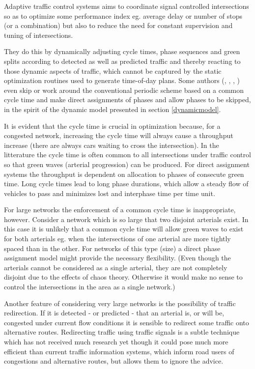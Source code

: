 \label{adaptive_cooperation}
Adaptive traffic control systems aims to coordinate signal controlled intersections so as to optimize some performance index eg. average delay or number of stops (or a combination) but also to reduce the need for constant supervision and tuning of intersections.

They do this by dynamically adjusting cycle times, phase sequences and green splits according to detected as well as predicted traffic and thereby reacting to those dynamic aspects of traffic, which cannot be captured by the static optimization routines used to generate time-of-day plans. Some authors (\cite{1}, \cite{44}, \cite{46}, \cite{scoot2004}) even skip or work around the conventional periodic scheme based on a common cycle time and make direct assignments of phases and allow phases to be skipped, in the spirit of the dynamic model presented in section \ref{dynamicmodel}. 

It is evident that the cycle time is crucial in optimization because, for a congested network, increasing the cycle time will always cause a throughput increase (there are always cars waiting to cross the intersection). In the litterature the cycle time is often common to all intersections under traffic control so that green waves (arterial progression) can be produced. For direct assignment systems the throughput is dependent on allocation to phases of consecute green time. Long cycle times lead to long phase durations, which allow a steady flow of vehicles to pass and minimizes lost and interphase time per time unit.

For large networks the enforcement of a common cycle time is inappropriate, however. Consider a network which is so large that two disjoint arterials exist. In this case it is unlikely that a common cycle time will allow green waves to exist for both arterials eg. when the intersections of one arterial are more tightly spaced than in the other. For networks of this type (size) a direct phase assignment model might provide the necessary flexibility. (Even though the arterials cannot be considered as a single arterial, they are not completely disjoint due to the effects of chaos theory. Otherwise it would make no sense to control the intersections in the area as  a single network.)

Another feature of considering very large networks is the possibility of traffic redirection. If it is detected - or predicted - that an arterial is, or will be, congested under current flow conditions it is sensible to redirect some traffic onto alternative routes. 
Redirecting traffic using traffic signals is a subtle technique which has not received much research yet though it could pose much more efficient than current traffic information systems, which inform road users of congestions and alternative routes, but allows them to ignore the advice.

